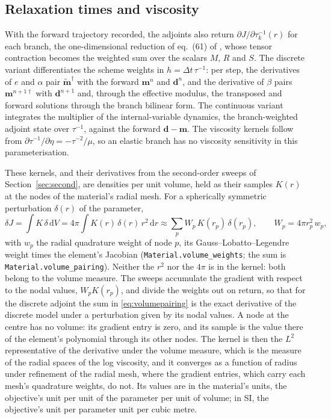 \documentclass[11pt,a4paper]{article}
\newcommand{\dd}{\mathrm{d}}
\newcommand{\code}[1]{\texttt{#1}}
\numberwithin{equation}{section}
\begin{document}
\subsection{Relaxation times and viscosity}
\label{sec:visckernel}

With the forward trajectory recorded, the adjoints also return
$\partial J/\partial\tau_{k}^{-1}(r)$ for each branch, the one-dimensional reduction
of eq.~(61) of \citet{YuEtAl2025}, whose tensor contraction becomes the
weighted sum over the scalars $M$, $R$ and $S$. The discrete variant
differentiates the scheme weights in $h=\Delta t\,\tau^{-1}$: per step, the
derivatives of $e$ and $\alpha$ pair $\tilde{\mathbf{m}}^{\dagger}$ with the forward
$\mathbf{m}^{n}$ and $\mathbf{d}^{n}$, and the derivative of $\beta$ pairs
$\mathbf{m}^{n+1\dagger}$ with $\mathbf{d}^{n+1}$ and, through the effective
modulus, the transposed and forward solutions through the branch bilinear form.
The continuous variant integrates the multiplier of the internal-variable
dynamics, the branch-weighted adjoint state over $\tau^{-1}$, against the forward
$\mathbf{d}-\mathbf{m}$. The viscosity kernels follow from
$\partial\tau^{-1}/\partial\eta = -\tau^{-2}/\mu$, so an elastic branch has no
viscosity sensitivity in this parameterisation.

These kernels, and their derivatives from the second-order sweeps of
Section~\ref{sec:second}, are densities per unit volume, held as their samples
$K(r)$ at the nodes of the material's radial mesh. For a spherically
symmetric perturbation $\delta(r)$ of the parameter,
\begin{equation}
\delta J = \int K\,\delta\,\dd V = 4\pi\int K(r)\,\delta(r)\,r^{2}\,\dd r
 \approx \sum_{p} W_{p}\,K(r_{p})\,\delta(r_{p}),\qquad
 W_{p} = 4\pi r_{p}^{2}\,w_{p},
\label{eq:volumepairing}
\end{equation}
with $w_{p}$ the radial quadrature weight of node $p$, its
Gauss--Lobatto--Legendre weight times the element's Jacobian
(\code{Material.volume\_weights}; the sum is
\code{Material.volume\_pairing}). Neither the $r^{2}$ nor the $4\pi$ is in the
kernel: both belong to the volume measure. The sweeps accumulate the gradient
with respect to the nodal values, $W_{p}K(r_{p})$, and divide the weights out
on return, so that for the discrete adjoint the sum in
\eqref{eq:volumepairing} is the exact derivative of the discrete model under a
perturbation given by its nodal values. A node at the centre has no volume:
its gradient entry is zero, and its sample is the value there of the
element's polynomial through its other nodes. The kernel is then the $L^{2}$
representative of the derivative under the volume measure, which is the
measure of the radial spaces of the log viscosity, and it converges as a
function of radius under refinement of the radial mesh, where the gradient
entries, which carry each mesh's quadrature weights, do not. Its values are in
the material's units, the objective's unit per unit of the parameter per unit
of volume; in SI, the objective's unit per parameter unit per cubic metre.
\end{document}
